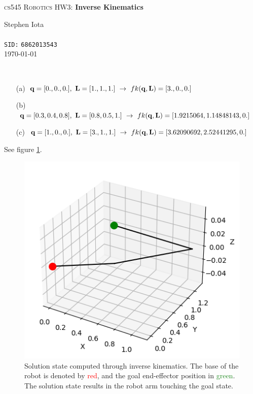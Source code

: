 \documentclass{article}
\begin{document}
    \begin{center}
        {\LARGE \textsc{cs545 Robotics HW3:} \textbf{Inverse Kinematics}}
    \end{center}

    \bigbreak

    \begin{center}
        Stephen Iota%
        \\
        \\
        \texttt{SID:} \texttt{6862013543}
        \\
        \today
    \end{center}

    \bigbreak

    \begin{problem}
        ~
        \begin{enumerate}
            \item[(a)] $\vb{q} = [0.,0.,0.],\ \vb{L} = [1.,1.,1.] \ \rightarrow \ fk(\vb{q}, \vb{L}) = [3., 0., 0.]$
            \item[(b)] $\vb{q} = [0.3,0.4,0.8],\ \vb{L} = [0.8,0.5,1.] \ \rightarrow \ fk(\vb{q}, \vb{L}) = [1.9215064, 1.14848143, 0.        ]$
            \item[(c)] $\vb{q} = [1.,0.,0.],\ \vb{L} = [3.,1.,1.] \ \rightarrow \ fk(\vb{q}, \vb{L}) = [3.62090692, 2.52441295, 0.        ]$
        \end{enumerate}
    \end{problem}

    \begin{problem}
        See figure \ref{fig:ik-a}.
    \end{problem}

    \begin{figure}[p]
        \centering
        \includegraphics[width=0.5\linewidth]{ik-a_solution.png}
        \caption{Solution state computed through inverse kinematics. The base of the robot is denoted by \textcolor{red}{red}, and the goal end-effector position in \textcolor{ForestGreen}{green}. The solution state results in the robot arm touching the \phantom{ForestGreen}{green} goal state.}
        \label{fig:ik-a}
    \end{figure}
\end{document}
